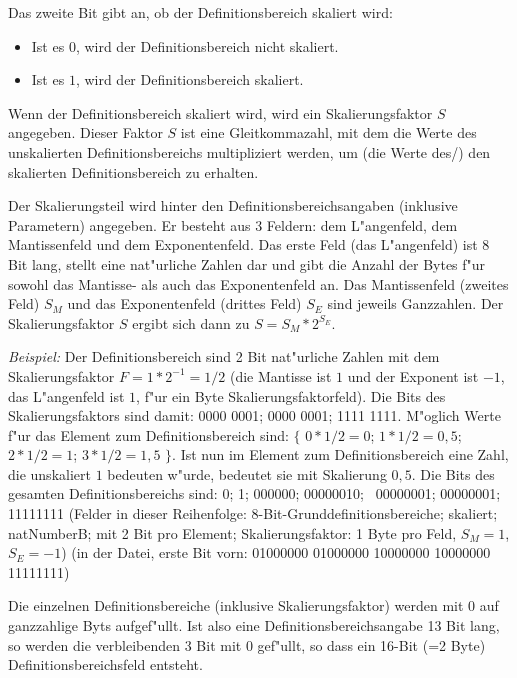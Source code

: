 \bigskip\noindent
Das zweite Bit gibt an, ob der Definitionsbereich skaliert wird:
\begin{itemize}
 \item Ist es $0$, wird der Definitionsbereich nicht skaliert.
 \item Ist es $1$, wird der Definitionsbereich skaliert.
\end{itemize}

Wenn der Definitionsbereich skaliert wird, wird ein Skalierungsfaktor $S$ angegeben. Dieser Faktor $S$ ist eine Gleitkommazahl, mit dem die Werte des unskalierten Definitionsbereichs multipliziert werden, um (die Werte des/) den skalierten Definitionsbereich zu erhalten.

Der Skalierungsteil wird hinter den Definitionsbereichsangaben (inklusive Parametern) angegeben. Er besteht aus 3 Feldern: dem L"angenfeld, dem Mantissenfeld und dem Exponentenfeld. Das erste Feld (das L"angenfeld) ist 8 Bit lang, stellt eine nat"urliche Zahlen dar und gibt die Anzahl der Bytes f"ur sowohl das Mantisse- als auch das Exponentenfeld an. Das Mantissenfeld (zweites Feld) $S_M$ und das Exponentenfeld (drittes Feld) $S_E$ sind jeweils Ganzzahlen. Der Skalierungsfaktor $S$ ergibt sich dann zu $S=S_M*2^{S_E}$.

\noindent
\textit{Beispiel:} Der Definitionsbereich sind 2 Bit nat"urliche Zahlen mit dem Skalierungsfaktor $F=1*2^{-1}=1/2$ (die Mantisse ist $1$ und der Exponent ist $-1$, das L"angenfeld ist $1$, f"ur ein Byte Skalierungsfaktorfeld). Die Bits des Skalierungsfaktors sind damit: 0000 0001; 0000 0001; 1111 1111. M"oglich Werte f"ur das Element zum Definitionsbereich sind: $\{$ $0*1/2=0$; $1*1/2=0,5$; $2*1/2=1$; $3*1/2=1,5$ $\}$. Ist nun im Element zum Definitionsbereich eine Zahl, die unskaliert $1$ bedeuten w"urde, bedeutet sie mit Skalierung $0,5$.
Die Bits des gesamten Definitionsbereichs sind: 0; 1; 000000; 00000010; \ 00000001; 00000001; 11111111 (Felder in dieser Reihenfolge: 8-Bit-Grunddefinitionsbereiche; skaliert; natNumberB; mit 2 Bit pro Element; Skalierungsfaktor: 1 Byte pro Feld, $S_M=1$, $S_E=-1$) (in der Datei, erste Bit vorn: 01000000 01000000 10000000 10000000 11111111)


\bigskip
Die einzelnen Definitionsbereiche (inklusive Skalierungsfaktor) werden mit 0 auf ganzzahlige Byts aufgef"ullt. Ist also eine Definitionsbereichsangabe 13 Bit lang, so werden die verbleibenden 3 Bit mit 0 gef"ullt, so dass ein 16-Bit (=2 Byte) Definitionsbereichsfeld entsteht.


